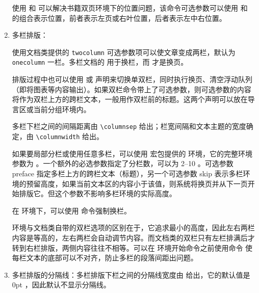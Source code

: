 \begin{enumerate}
使用 \boxforcmd{\\fancyhead[]{}} 和 \boxforcmd{\\fancyfoot[]{}} 可以解决书籍双页环境下的位置问题，该命令可选参数可以使用  和  的组合表示位置，前者表示左页或右叶位置，后者表示左中右位置。


\item 多栏排版：
\begin{multicols}{2}
    
    使用文档类提供的 \verb|twocolumn| 可选参数项可以使文章变成两栏，默认为 \verb|onecolumn| 一栏。多栏文档的 \boxforcmd{\\newpage} 用于换栏，而 \boxforcmd{\\clearpage} 才是换页。
    
    排版过程中也可以使用 \boxforcmd{\\twocolumn} 或  声明来切换单双栏，同时执行换页、清空浮动队列（即将图表等内容输出）。如果双栏命令带上了可选参数，则可选参数的内容将作为双栏上方的跨栏文本，一般用作双栏前的标题。这两个声明可以放在导言区或当前分组环境内。

    多栏下栏之间的间隔距离由 \verb|\columnsep| 给出；栏宽间隔和文本主题的宽度确定，由 \verb|\columnwidth| 给出。
    
    \vspace{1em}
    
    如果要局部分栏或使用任意多栏，可以使用  宏包提供的  环境，它的完整环境参数为  。一个额外的必选参数指定了分栏数，可以为 2--10 。可选参数 {\ttit preface} 指定多栏上方的跨栏文本（标题），另一个可选参数 {\ttit skip} 表示多栏环境的预留高度，如果当前文本区的内容小于该值，则系统将换页并从下一页开始排版它。但这个参数不影响多栏环境的实际高度。
   
    在  环境下，可以使用 \boxforcmd{\\columnbreak} 命令强制换栏。

     环境与文档类自带的双栏选项的区别在于，它追求最小的高度，因此左右两栏内容是等高的，左右两栏会自动调节内容。而文档类的双栏只有左栏排满后才转到右栏排版，两侧内容往往不相等。可以在  环境开始命令之前使用命令 \boxforcmd{\\raggedcolumns} 使每栏文本的底部可以不对齐，防止多栏的段落间距出问题。

\end{multicols}

\item 多栏排版的分隔线：多栏排版下栏之间的分隔线宽度由  给出，它的默认值是 0pt ，因此默认不显示分隔线。


\end{enumerate}
